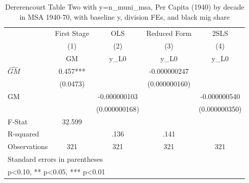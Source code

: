 \begin{table}[htbp]\centering
\def\sym#1{\ifmmode^{#1}\else\(^{#1}\)\fi}
\caption{Dererencourt Table Two with y=n\_muni\_msa, Per Capita (1940) by decade in MSA 1940-70, with baseline y, division FEs, and black mig share}
\begin{tabular}{l*{4}{c}}
\toprule
                    & First Stage   &         OLS   &Reduced Form   &        2SLS   \\
                    &\multicolumn{1}{c}{(1)}&\multicolumn{1}{c}{(2)}&\multicolumn{1}{c}{(3)}&\multicolumn{1}{c}{(4)}\\
                    &\multicolumn{1}{c}{GM}&\multicolumn{1}{c}{y\_L0}&\multicolumn{1}{c}{y\_L0}&\multicolumn{1}{c}{y\_L0}\\
\midrule
$\hat{GM}$          &       0.457***&               &-0.000000247   &               \\
                    &    (0.0473)   &               &(0.000000160)   &               \\
\addlinespace
GM                  &               &-0.000000103   &               &-0.000000540   \\
                    &               &(0.000000168)   &               &(0.000000350)   \\
\midrule
F-Stat              &      32.599   &               &               &               \\
R-squared           &               &        .136   &        .141   &               \\
Observations        &         321   &         321   &         321   &         321   \\
\bottomrule
\multicolumn{5}{l}{\footnotesize Standard errors in parentheses}\\
\multicolumn{5}{l}{\footnotesize * p<0.10, ** p<0.05, *** p<0.01}\\
\end{tabular}
\end{table}

